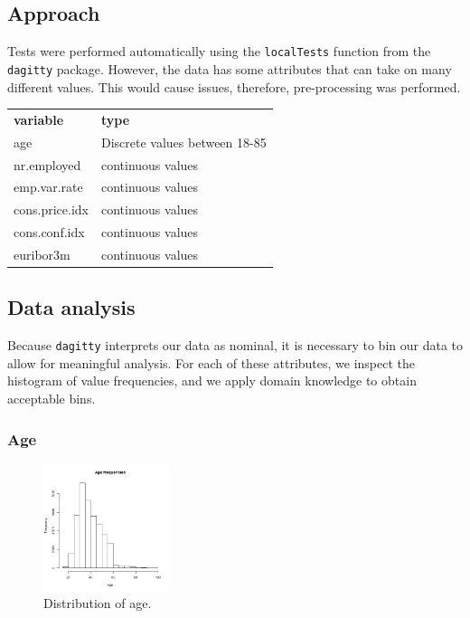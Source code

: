 \documentclass[11pt]{article}
\begin{document}
\begin{multicols}{2}
\section{Approach}
Tests were performed automatically using the \texttt{localTests} function from
the \texttt{dagitty} package.  However, the data has some attributes that can
take on many different values. This would cause issues, therefore, pre-processing was performed.

    \begin{tabular}{ll}
        \textbf{variable} & \textbf{type} \\
        age & Discrete values between 18-85 \\
        nr.employed & continuous values \\
        emp.var.rate & continuous values \\
        cons.price.idx & continuous values \\
        cons.conf.idx & continuous values \\
        euribor3m & continuous values \\
    \end{tabular}

\subsection{Data analysis}
Because \texttt{dagitty} interprets our data as nominal, it is necessary to bin
our data to allow for meaningful analysis. For each of these attributes, we
inspect the histogram of value frequencies, and we apply domain knowledge to obtain
acceptable bins.

\newpage
\subsubsection{Age}
\begin{figure}[H]
	\centering
	\includegraphics[width=0.33\textwidth]{images/age}
	\caption{Distribution of age.}
	\label{fig:age}
\end{figure}


\end{multicols}
\end{document}
